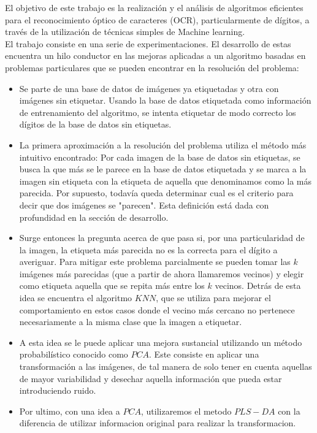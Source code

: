 
El objetivo de este trabajo es la realización y el análisis de algoritmos eficientes para el reconocimiento óptico de caracteres (OCR), particularmente de dígitos,  a través de la utilización de técnicas simples de Machine learning.
\\
El trabajo consiste en una serie de experimentaciones. El desarrollo de estas encuentra un hilo conductor en las mejoras aplicadas a un algoritmo basadas en problemas particulares que se pueden encontrar en la resolución del problema:

\begin{itemize}

    \item Se parte de una base de datos de imágenes ya etiquetadas y otra con imágenes sin etiquetar. Usando la base de datos etiquetada como información de entrenamiento del algoritmo, se intenta etiquetar de modo correcto los dígitos de la base de datos sin etiquetas.

    \item La primera aproximación a la resolución del problema utiliza el método más intuitivo encontrado: Por cada imagen de la base de datos sin etiquetas, se busca la que más se le parece en la base de datos etiquetada y se marca a la imagen sin etiqueta con la etiqueta de aquella que denominamos como la más parecida. Por supuesto, todavía queda determinar cual es el criterio para decir que dos imágenes se "parecen". Esta definición está dada con profundidad en la sección de desarrollo.

    \item Surge entonces la pregunta acerca de que pasa si, por una particularidad de la imagen, la etiqueta más parecida no es la correcta para el dígito a averiguar. Para mitigar este problema parcialmente se pueden tomar las $k$ imágenes más parecidas (que a partir de ahora llamaremos vecinos) y elegir como etiqueta aquella que se repita más entre los $k$ vecinos. Detrás de esta idea se encuentra el algoritmo $KNN$, que se utiliza para mejorar el comportamiento en estos casos donde el vecino más cercano no pertenece necesariamente a la misma clase que la imagen a etiquetar.

    \item A esta idea se le puede aplicar una mejora sustancial utilizando un método probabilístico conocido como $PCA$. Este consiste en aplicar una transformación a las imágenes, de tal manera de solo tener en cuenta aquellas de mayor variabilidad y desechar aquella información que pueda estar introduciendo ruido.

    \item Por ultimo,  con una idea a $PCA$,  utilizaremos el metodo $PLS-DA$ con la diferencia de utilizar informacion original para realizar la transformacion.


\end{itemize}
